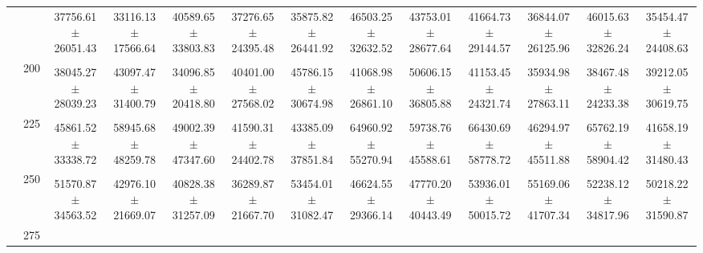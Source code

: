 \begin{table}[h]
{\begin{tabular}{
        ccccccccccccc}
 & & \cellcolor[HTML]{EFEFEF} 37756.61 $\pm$ 26051.43& \cellcolor[HTML]{EFEFEF} 33116.13 $\pm$ 17566.64& \cellcolor[HTML]{EFEFEF} 40589.65 $\pm$ 33803.83& \cellcolor[HTML]{EFEFEF} 37276.65 $\pm$ 24395.48& \cellcolor[HTML]{EFEFEF} 35875.82 $\pm$ 26441.92& \cellcolor[HTML]{EFEFEF} 46503.25 $\pm$ 32632.52& \cellcolor[HTML]{EFEFEF} 43753.01 $\pm$ 28677.64& \cellcolor[HTML]{EFEFEF} 41664.73 $\pm$ 29144.57& \cellcolor[HTML]{EFEFEF} 36844.07 $\pm$ 26125.96& \cellcolor[HTML]{EFEFEF} 46015.63 $\pm$ 32826.24& \cellcolor[HTML]{EFEFEF} 35454.47 $\pm$ 24408.63 \\ 
 & \multirow{2}{*}{200}& & & & & & & & & & &  \\ 
 & & 38045.27 $\pm$ 28039.23& 43097.47 $\pm$ 31400.79& 34096.85 $\pm$ 20418.80& 40401.00 $\pm$ 27568.02& 45786.15 $\pm$ 30674.98& 41068.98 $\pm$ 26861.10& 50606.15 $\pm$ 36805.88& 41153.45 $\pm$ 24321.74& 35934.98 $\pm$ 27863.11& 38467.48 $\pm$ 24233.38& 39212.05 $\pm$ 30619.75 \\ 
 & \multirow{2}{*}{225}& \cellcolor[HTML]{EFEFEF} & \cellcolor[HTML]{EFEFEF} & \cellcolor[HTML]{EFEFEF} & \cellcolor[HTML]{EFEFEF} & \cellcolor[HTML]{EFEFEF} & \cellcolor[HTML]{EFEFEF} & \cellcolor[HTML]{EFEFEF} & \cellcolor[HTML]{EFEFEF} & \cellcolor[HTML]{EFEFEF} & \cellcolor[HTML]{EFEFEF} & \cellcolor[HTML]{EFEFEF}  \\ 
 & & \cellcolor[HTML]{EFEFEF} 45861.52 $\pm$ 33338.72& \cellcolor[HTML]{EFEFEF} 58945.68 $\pm$ 48259.78& \cellcolor[HTML]{EFEFEF} 49002.39 $\pm$ 47347.60& \cellcolor[HTML]{EFEFEF} 41590.31 $\pm$ 24402.78& \cellcolor[HTML]{EFEFEF} 43385.09 $\pm$ 37851.84& \cellcolor[HTML]{EFEFEF} 64960.92 $\pm$ 55270.94& \cellcolor[HTML]{EFEFEF} 59738.76 $\pm$ 45588.61& \cellcolor[HTML]{EFEFEF} 66430.69 $\pm$ 58778.72& \cellcolor[HTML]{EFEFEF} 46294.97 $\pm$ 45511.88& \cellcolor[HTML]{EFEFEF} 65762.19 $\pm$ 58904.42& \cellcolor[HTML]{EFEFEF} 41658.19 $\pm$ 31480.43 \\ 
 & \multirow{2}{*}{250}& & & & & & & & & & &  \\ 
 & & 51570.87 $\pm$ 34563.52& 42976.10 $\pm$ 21669.07& 40828.38 $\pm$ 31257.09& 36289.87 $\pm$ 21667.70& 53454.01 $\pm$ 31082.47& 46624.55 $\pm$ 29366.14& 47770.20 $\pm$ 40443.49& 53936.01 $\pm$ 50015.72& 55169.06 $\pm$ 41707.34& 52238.12 $\pm$ 34817.96& 50218.22 $\pm$ 31590.87 \\ 
 & \multirow{2}{*}{275}& \cellcolor[HTML]{EFEFEF} & \cellcolor[HTML]{EFEFEF} & \cellcolor[HTML]{EFEFEF} & \cellcolor[HTML]{EFEFEF} & \cellcolor[HTML]{EFEFEF} & \cellcolor[HTML]{EFEFEF} & \cellcolor[HTML]{EFEFEF} & \cellcolor[HTML]{EFEFEF} & \cellcolor[HTML]{EFEFEF} & \cellcolor[HTML]{EFEFEF} & \cellcolor[HTML]{EFEFEF}  \\ 

\end{tabular}}
\end{table}
